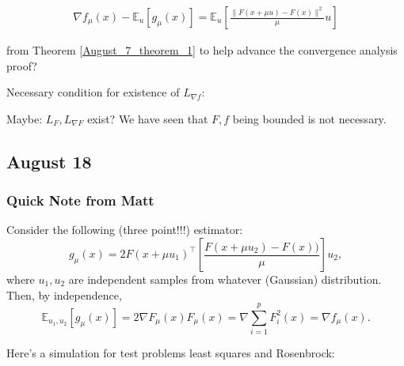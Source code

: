 \documentclass{article}
\begin{document}
\begin{align*}
\nabla f_{\mu}(x) - \mathbb{E}_u[g_{\mu}(x)] = \mathbb{E}_u\left[\frac{\| F(x+\mu u)-F(x) \|^2}{\mu}u\right]
\end{align*}

from Theorem \ref{August_7_theorem_1} to help advance the convergence analysis proof? \newline 


Necessary condition for existence of $L_{\nabla f}$: \newline 

Maybe: $L_{F}, L_{\nabla F}$ exist? We have seen that $F, f$ being bounded is not necessary. \newline 

\subsection{August 18}

\subsubsection{Quick Note from Matt}
Consider the following (three point!!!) estimator:
$$g_{\mu}(x) = 2F(x+\mu u_1)^\top \left[\displaystyle\frac{F(x+\mu u_2)-F(x))}{\mu}\right] u_2,$$
where $u_1,u_2$ are independent samples from whatever (Gaussian) distribution. 
Then, by independence,
$$\mathbb{E}_{u_1,u_2} \left[ g_{\mu}(x)\right] = 2\nabla F_{\mu}(x)F_{\mu}(x) = \nabla\displaystyle\sum_{i=1}^p F_i^2(x) = \nabla f_{\mu}(x). $$

Here's a simulation for test problems least squares and Rosenbrock: \newline 

\newpage 
\end{document}
